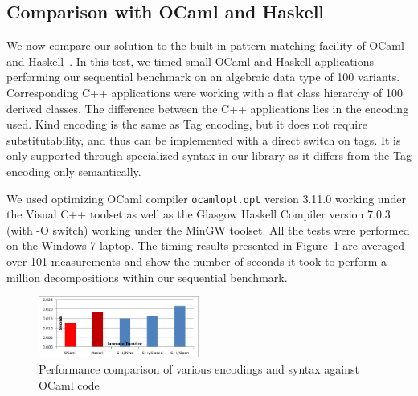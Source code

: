 \subsection{Comparison with OCaml and Haskell}
\label{sec:ocaml}

We now compare our solution to the built-in pattern-matching facility of 
OCaml~\cite{OPM01} and Haskell~\cite{Haskell98Book}.  
In this test, we timed small OCaml and Haskell applications performing our sequential 
benchmark on an algebraic data type of 100 variants. Corresponding C++ 
applications were working with a flat class hierarchy of 100 derived classes. 
The difference between the C++ applications lies in the encoding used. Kind 
encoding is the same as Tag encoding, but it does not require substitutability, 
and thus can be implemented with a direct switch on tags. It is only supported 
through specialized syntax in our library as it differs from the Tag encoding 
only semantically.



We used optimizing OCaml compiler \texttt{ocamlopt.opt} version 3.11.0 working 
under the Visual C++ toolset as well as the Glasgow Haskell Compiler version 
7.0.3 (with -O switch) working under the MinGW toolset. All the tests were 
performed on the Windows 7 laptop.
The timing results presented in Figure~\ref{fig:OCamlComparison} are averaged 
over 101 measurements and show the number of seconds it took to perform a 
million decompositions within our sequential benchmark.

\begin{figure}[htbp]
  \centering
    \includegraphics[width=0.47\textwidth]{OCamlComparison.png}
  \caption{Performance comparison of various encodings and syntax against OCaml code}
  \label{fig:OCamlComparison}
\end{figure}

